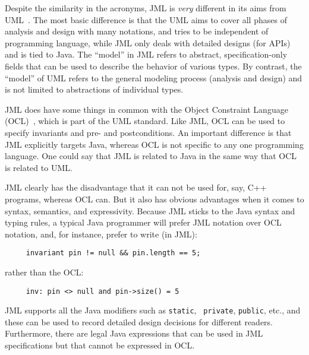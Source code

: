 Despite the similarity in the acronyms, JML is {\em very} different in
its aims from UML~\cite{RumbaughJacobsonBooch98}.
The most basic difference is that the UML aims to cover all phases of
analysis and design with many notations, and tries to be independent
of programming language, while JML only deals with detailed designs
(for APIs) and is tied to Java.  The ``model'' in
JML refers to abstract, specification-only fields that can be used to
describe the behavior of various types.  By contrast, the ``model'' of
UML refers to the general modeling process (analysis and design) and
is not limited to abstractions of individual types.

JML does have some things in common with the Object Constraint
Language (OCL)~\cite{WarmerKleppe99}, which is part of the UML
standard.  Like JML, OCL can be used to specify invariants and pre-
and postconditions.  An important difference is that JML explicitly
targets Java, whereas OCL is not specific to any one programming
language.  One could say that JML is related to Java in the same way
that OCL is related to UML\@.

JML clearly has the disadvantage that it can not be used for, say, C++
programs, whereas OCL can.  But it also has obvious advantages when it
comes to syntax, semantics, and expressivity.  Because JML sticks to
the Java syntax and typing rules, a typical Java programmer will
prefer JML notation over OCL notation, and, for instance, prefer to
write (in JML):
\begin{verbatim}
     invariant pin != null && pin.length == 5;
\end{verbatim}
rather than the OCL:
\begin{verbatim}
     inv: pin <> null and pin->size() = 5
\end{verbatim}

JML supports all the Java modifiers such as {\tt static}, {\tt
  private}, {\tt public}, etc., and these can be used to record
detailed design decisions for different readers.
Furthermore, there are legal Java
expressions that can be used in JML specifications but that cannot be
expressed in OCL\@.

